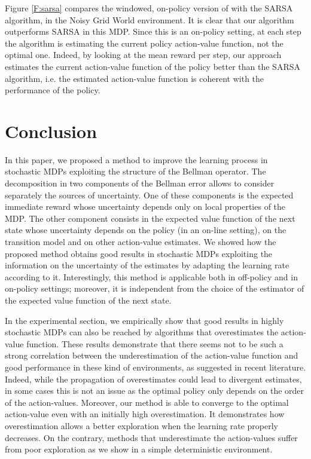 \documentclass[conference]{IEEEtran}
\begin{document}
Figure \ref{F:sarsa} compares the windowed, on-policy version of \alg with the SARSA algorithm, in the Noisy Grid World environment. It is clear that our algorithm outperforms SARSA in this MDP.
Since this is an on-policy setting, at each step the algorithm is estimating the current policy action-value function, not the optimal one. Indeed, by looking at the mean reward per step, our approach estimates the current action-value function of the policy better than the SARSA algorithm, i.e. the estimated action-value function is coherent with the performance of the policy.

\section{Conclusion}
In this paper, we proposed a method to improve the learning process in stochastic MDPs exploiting the structure of the Bellman operator. The decomposition in two components of the Bellman error allows to consider separately the sources of uncertainty. One of these components is the expected immediate reward whose uncertainty depends only on local properties of the MDP. The other component consists in the expected value function of the next state whose uncertainty depends on the policy (in an on-line setting), on the transition model and on other action-value estimates. We showed how the proposed method obtains good results in stochastic MDPs exploiting the information on the uncertainty of the estimates by adapting the learning rate according to it. Interestingly, this method is applicable both in off-policy and in on-policy settings; moreover, it is independent from the choice of the estimator of the expected value function of the next state.

In the experimental section, we empirically show that good results in highly stochastic MDPs can also be reached by algorithms that overestimates the action-value function. These results demonstrate that there seems not to be such a strong correlation between the underestimation of the action-value function and good performance in these kind of environments, as suggested in recent literature. Indeed, while the propagation of overestimates could lead to divergent estimates, in some cases this is not an issue as the optimal policy only depends on the order of the action-values. Moreover, our method is able to converge to the optimal action-value even with an initially high overestimation. It demonstrates how overestimation allows a better exploration when the learning rate properly decreases. On the contrary, methods that underestimate the action-values suffer from poor exploration as we show in a simple deterministic environment.
\end{document}
